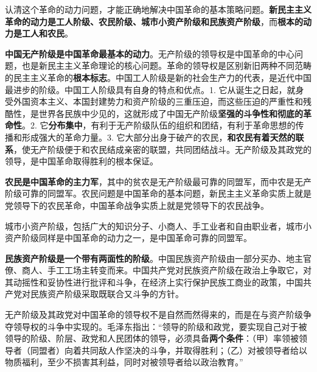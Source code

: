 认清这个革命的动力问题，才能正确地解决中国革命的基本策略问题。\textbf{{新民主主义革命的动力}{是工人阶级、农民阶级、城市小资产阶级和民族资产阶级}}，而\textbf{{根本的动力是工人和农民}}。

\textbf{{中国无产阶级是中国革命最基本的动力}}。{无产阶级的领导权是中国革命的中心问题，也是新民主主义革命理论的核心问题}。{革命的领导权是区别新旧两种不同范畴的民主主义革命的}\textbf{{根本标志}}。中国工人阶级是新的社会生产力的代表，是近代中国最进步的阶级。中国工人阶级具有{自身的特点和优点}。1.
它从诞生之日起，就身受外国资本主义、本国封建势力和资产阶级的三重压迫，而这些压迫的严重性和残酷性，是世界各民族中少见的，这就形成了中国无产阶级\textbf{{坚强的斗争性和彻底的革命性}}。2.
它\textbf{{分布集中}}，有利于无产阶级队伍的组织和团结，有利于革命思想的传播和形成强大的革命力量。3.
它大部分出身于破产的农民，\textbf{{和农民有着天然的联系}}，使无产阶级便于和农民结成亲密的联盟，共同团结战斗。无产阶级及其政党的领导，是中国革命取得胜利的根本保证。

\textbf{{农民是中国革命的主力军}}，其中的贫{农是无产阶级最可靠的同盟军，而中农是无产阶级可靠的同盟军}。{农民问题是中国革命的基本问题}，{新民主主义革命实质上就是党领导下的农民革命，中国革命战争实质上就是党领导下的农民战争}。

{城市小资产阶级，包括广大的知识分子、小商人、手工业者和自由职业者，城市小资产阶级同样是中国革命的动力之一}，{是中国革命可靠的同盟军}。

\textbf{{民族资产阶级是一个带有两面性的阶级}}。中国民族资产阶级由一部分买办、地主官僚、商人、手工工场主转变而来。中国共产党对民族资产阶级在政治上争取它，对其动摇性和妥协性进行批评和斗争，在经济上实行保护民族工商业的政策，中国共产党对民族资产阶级采取{既联合又斗争}的方针。

{无产阶级及其政党对中国革命的领导权不是自然而然得来的，而是在与资产阶级争夺领导权的斗争中实现的}{。毛泽东指出：``领导的阶级和政党，要实现自己对于被领导的阶级、阶层、政党和人民团体的领导，必须具备}\textbf{{两个条件}}{：（甲）率领被领导者（同盟者）向着共同敌人作坚决的斗争，并取得胜利；（乙）对被领导者给以物质福利，至少不损害其利益，同时对被领导者给以政治教育。''}
